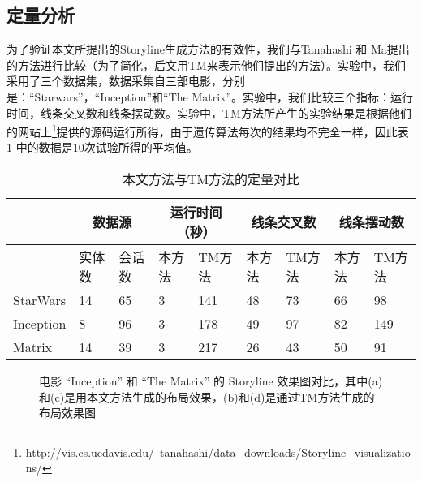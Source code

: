 \subsection{定量分析}
为了验证本文所提出的Storyline生成方法的有效性，我们与Tanahashi 和 Ma\cite{tanahashi2012design}提出的方法进行比较（为了简化，后文用TM来表示他们提出的方法）。实验中，我们采用了三个数据集，数据采集自三部电影，分别是：“Starwars”，“Inception”和“The Matrix”。实验中，我们比较三个指标：运行时间，线条交叉数和线条摆动数。实验中，TM方法所产生的实验结果是根据他们的网站上\footnote{http://vis.cs.ucdavis.edu/~tanahashi/data\_downloads/Storyline\_visualizations/}提供的源码运行所得，由于遗传算法每次的结果均不完全一样，因此表 \ref{table:quantitative-analysis} 中的数据是10次试验所得的平均值。

\begin{table}[!htb]
\caption{本文方法与TM方法的定量对比}
\label{table:quantitative-analysis}
\begin{center}
  \begin{tabular}{|*{9}{l |}}
    \hline
              & \multicolumn{2}{c|}{数据源} & \multicolumn{2}{c|}{运行时间（秒）} & \multicolumn{2}{c|}{线条交叉数} & \multicolumn{2}{c|}{线条摆动数} \\
    \hline
              & 实体数  & 会话数  & 本方法  & TM方法  & 本方法  & TM方法  & 本方法  & TM方法 \\ \hline
    StarWars  & 14     & 65     & 3     & 141    &  48    &  73    &  66    & 98    \\ \hline
    Inception &  8     & 96     & 3     & 178    &  49    &  97    &  82    & 149   \\ \hline
    Matrix    & 14     & 39     & 3     & 217    &  26    &  43    &  50    & 91    \\ \hline
  \end{tabular}
\end{center}
\end{table}

\begin{figure}[!htb]
    \centering




    \caption{电影 “Inception” 和 “The Matrix” 的 Storyline 效果图对比，其中(a)和(c)是用本文方法生成的布局效果，(b)和(d)是通过TM方法生成的布局效果图}
    \label{fig:layout-comparison}
\end{figure}

